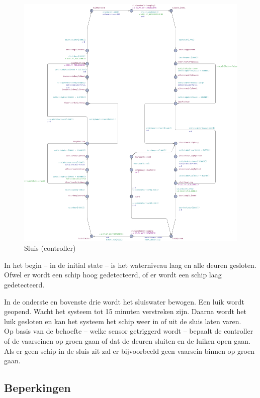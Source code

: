\documentclass{article} %
\begin{document}
\begin{figure}[h]
\includegraphics[width=\linewidth]{sluis.png}
\centering    
\caption{Sluis (controller)}
\end{figure}

In het begin -- in de initial state -- is het waterniveau laag en alle deuren gesloten. Ofwel er wordt een schip hoog gedetecteerd, of er wordt een schip laag gedetecteerd. \par

In de onderste en bovenste drie wordt het sluiswater bewogen. Een luik wordt geopend. Wacht het systeem tot 15 minuten verstreken zijn. Daarna wordt het luik gesloten en kan het systeem het schip weer in of uit de sluis laten varen. \\
Op basis van de behoefte -- welke sensor getriggerd wordt -- bepaalt de controller of de vaarseinen op groen gaan of dat de deuren sluiten en de luiken open gaan. \\
Als er geen schip in de sluis zit zal er bijvoorbeeld geen vaarsein binnen op groen gaan.

\newpage

\subsection{Beperkingen}
\end{document}
